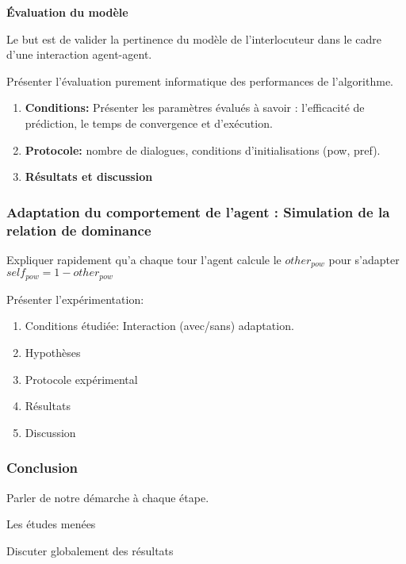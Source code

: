 \textbf{Évaluation du modèle}

Le but est de valider la pertinence du modèle de l'interlocuteur dans le cadre d'une interaction agent-agent. 
\par Présenter l'évaluation purement informatique des performances de l'algorithme.
\begin{enumerate}
	\item \textbf{Conditions:} Présenter les paramètres évalués à savoir : l'efficacité de prédiction, le temps de convergence et d'exécution.
	\item \textbf{Protocole:} nombre de dialogues, conditions d'initialisations (pow, pref).
	\item \textbf{Résultats et discussion}
\end{enumerate}

\subsubsection{Adaptation du comportement de l'agent : Simulation de la relation de dominance}		
Expliquer rapidement qu'a chaque tour l'agent calcule le $other_{pow}$ pour s'adapter $ self_{pow}= 1 - other_{pow}$

Présenter l'expérimentation:

\begin{enumerate}
	\item Conditions étudiée: Interaction (avec/sans) adaptation.
	\item Hypothèses
	\item Protocole expérimental
	\item Résultats
	\item Discussion
\end{enumerate}

\subsubsection{Conclusion}
Parler de notre démarche à chaque étape.

Les études menées

Discuter globalement des résultats